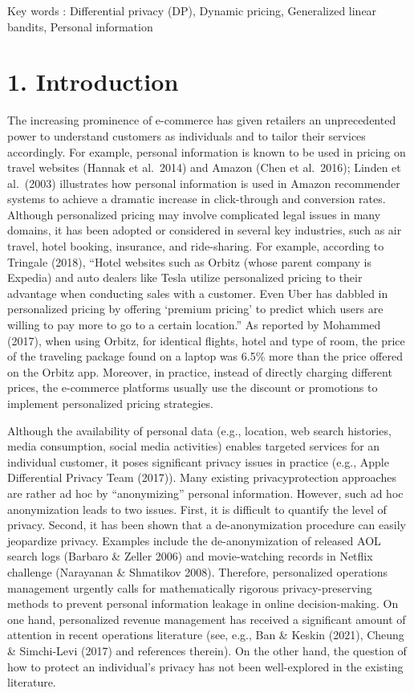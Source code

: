 Key words : Differential privacy (DP), Dynamic pricing, Generalized linear bandits, Personal information

\section{1. Introduction}\label{introduction}

The increasing prominence of e-commerce has given retailers an unprecedented power to understand customers as individuals and to tailor their services accordingly. For example, personal information is known to be used in pricing on travel websites (Hannak et al.~2014) and Amazon (Chen et al.~2016); Linden et al.~(2003) illustrates how personal information is used in Amazon recommender systems to achieve a dramatic increase in click-through and conversion rates. Although personalized pricing may involve complicated legal issues in many domains, it has been adopted or considered in several key industries, such as air travel, hotel booking, insurance, and ride-sharing. For example, according to Tringale (2018), ``Hotel websites such as Orbitz (whose parent company is Expedia) and auto dealers like Tesla utilize personalized pricing to their advantage when conducting sales with a customer. Even Uber has dabbled in personalized pricing by offering `premium pricing' to predict which users are willing to pay more to go to a certain location.'' As reported by Mohammed (2017), when using Orbitz, for identical flights, hotel and type of room, the price of the traveling package found on a laptop was 6.5\% more than the price offered on the Orbitz app. Moreover, in practice, instead of directly charging different prices, the e-commerce platforms usually use the discount or promotions to implement personalized pricing strategies.

Although the availability of personal data (e.g., location, web search histories, media consumption, social media activities) enables targeted services for an individual customer, it poses significant privacy issues in practice (e.g., Apple Differential Privacy Team (2017)). Many existing privacyprotection approaches are rather ad hoc by ``anonymizing'' personal information. However, such ad hoc anonymization leads to two issues. First, it is difficult to quantify the level of privacy. Second, it has been shown that a de-anonymization procedure can easily jeopardize privacy. Examples include the de-anonymization of released AOL search logs (Barbaro \& Zeller 2006) and movie-watching records in Netflix challenge (Narayanan \& Shmatikov 2008). Therefore, personalized operations management urgently calls for mathematically rigorous privacy-preserving methods to prevent personal information leakage in online decision-making. On one hand, personalized revenue management has received a significant amount of attention in recent operations literature (see, e.g., Ban \& Keskin (2021), Cheung \& Simchi-Levi (2017) and references therein). On the other hand, the question of how to protect an individual's privacy has not been well-explored in the existing literature.

